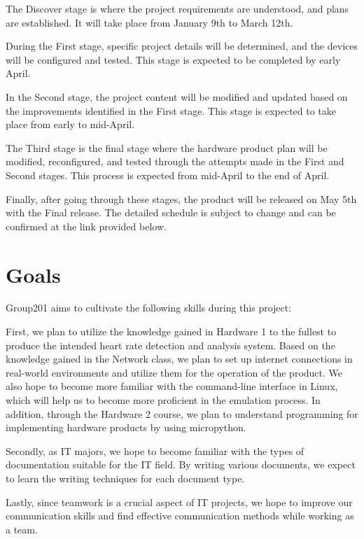 \documentclass{article}
\begin{document}
The Discover stage is where the project requirements are understood, and plans are established. It will take place from January 9th to March 12th.

During the First stage, specific project details will be determined, and the devices will be configured and tested. This stage is expected to be completed by early April.

In the Second stage, the project content will be modified and updated based on the improvements identified in the First stage. This stage is expected to take place from early to mid-April.

The Third stage is the final stage where the hardware product plan will be modified, reconfigured, and tested through the attempts made in the First and Second stages. This process is expected from mid-April to the end of April.

Finally, after going through these stages, the product will be released on May 5th with the Final release. The detailed schedule is subject to change and can be confirmed at the link provided below.



\section{Goals}
Group201 aims to cultivate the following skills during this project:



First, we plan to utilize the knowledge gained in Hardware 1 to the fullest to produce the intended heart rate detection and analysis system. Based on the knowledge gained in the Network class, we plan to set up internet connections in real-world environments and utilize them for the operation of the product. We also hope to become more familiar with the command-line interface in Linux, which will help us to become more proficient in the emulation process. In addition, through the Hardware 2 course, we plan to understand programming for implementing hardware products by using micropython.



Secondly, as IT majors, we hope to become familiar with the types of documentation suitable for the IT field. By writing various documents, we expect to learn the writing techniques for each document type.



Lastly, since teamwork is a crucial aspect of IT projects, we hope to improve our communication skills and find effective communication methods while working as a team.
\end{document}
